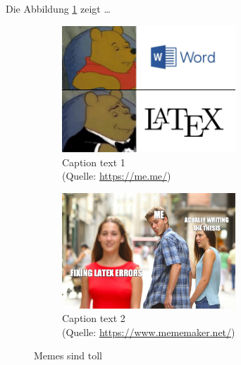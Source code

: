Die Abbildung \ref{fig:latex} zeigt \dots
\begin{figure}[hb]
    \begin{subfigure}{6cm}
      \centering
      \includegraphics[width=6.5cm]{abb/1zfte27tn3q21.jpg}
      \caption{Caption text 1\\ (Quelle: \url{https://me.me/})}
    \end{subfigure}
    \begin{subfigure}{6cm}
      \centering
      \includegraphics[width=6.5cm]{abb/bucket.png}
      \caption{Caption text 2\\ (Quelle: \url{https://www.mememaker.net/})}
    \end{subfigure}
    \caption[Memes sind toll]{Memes sind toll}
    \label{fig:latex}
\end{figure}